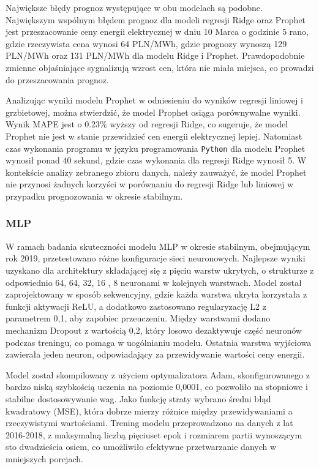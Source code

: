 Największe błędy prognoz występujące w obu modelach są podobne. Największym wspólnym błędem prognoz dla modeli regresji Ridge oraz Prophet jest przeszacowanie ceny energii elektrycznej w dniu 10 Marca o godzinie 5 rano, gdzie rzeczywista cena wynosi 64 PLN/MWh, gdzie prognozy wynoszą 129 PLN/MWh oraz 131 PLN/MWh dla modelu Ridge i Prophet. Prawdopodobnie zmienne objaśniające sygnalizują wzrost cen, która nie miała miejsca, co prowadzi do przeszacowania prognoz.

Analizując wyniki modelu Prophet w odniesieniu do wyników regresji liniowej i grzbietowej, można stwierdzić, że model Prophet osiąga porównywalne wyniki. Wynik MAPE jest o 0.23\% wyższy od regresji Ridge, co sugeruje, że model Prophet nie jest w stanie przewidzieć cen energii elektrycznej lepiej. Natomiast czas wykonania programu w języku programowania \texttt{Python} dla modelu Prophet wynosił ponad 40 sekund, gdzie czas wykonania dla regresji Ridge wynosił 5. W kontekście analizy zebranego zbioru danych, należy zauważyć, że model Prophet nie przynosi żadnych korzyści w porównaniu do regresji Ridge lub liniowej w przypadku prognozowania w okresie stabilnym.

\subsubsection{MLP}

W ramach badania skuteczności modelu MLP w okresie stabilnym, obejmującym rok 2019, przetestowano różne konfiguracje sieci neuronowych. Najlepsze wyniki uzyskano dla architektury składającej się z pięciu warstw ukrytych, o strukturze z odpowiednio 64, 64, 32, 16 , 8 neuronami w kolejnych warstwach. Model został zaprojektowany w sposób sekwencyjny, gdzie każda warstwa ukryta korzystała z funkcji aktywacji ReLU, a dodatkowo zastosowano regularyzację L2 z parametrem 0,1, aby zapobiec przeuczeniu. Między warstwami dodano mechanizm Dropout z wartością 0,2, który losowo dezaktywuje część neuronów podczas treningu, co pomaga w uogólnianiu modelu. Ostatnia warstwa wyjściowa zawierała jeden neuron, odpowiadający za przewidywanie wartości ceny energii.

Model został skompilowany z użyciem optymalizatora Adam, skonfigurowanego z bardzo niską szybkością uczenia na poziomie 0,0001, co pozwoliło na stopniowe i stabilne dostosowywanie wag. Jako funkcję straty wybrano średni błąd kwadratowy (MSE), która dobrze mierzy różnice między przewidywaniami a rzeczywistymi wartościami. Trening modelu przeprowadzono na danych z lat 2016-2018, z maksymalną liczbą pięciuset epok i rozmiarem partii wynoszącym sto dwadzieścia osiem, co umożliwiło efektywne przetwarzanie danych w mniejszych porcjach.

